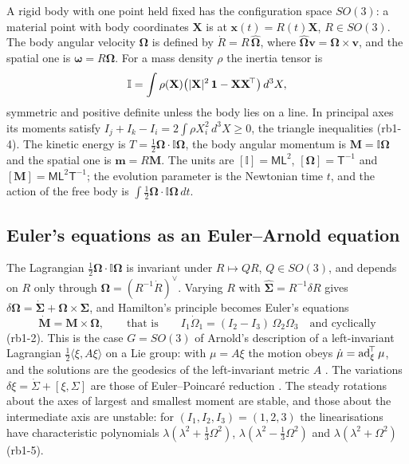 A rigid body with one point held fixed has the configuration space $SO(3)$: a material point with body coordinates $\mathbf X$ is at
$\mathbf x(t)=R(t)\mathbf X$, $R\in SO(3)$. The body angular velocity $\boldsymbol\Omega$ is defined by $\dot R=R\,\widehat{\boldsymbol\Omega}$, where
$\widehat{\boldsymbol\Omega}\mathbf v=\boldsymbol\Omega\times\mathbf v$, and the spatial one is $\boldsymbol\omega=R\boldsymbol\Omega$. For a mass density $\rho$ the
inertia tensor is
\begin{equation}
\label{eq:rb:inertia}
\mathbb I=\int\rho(\mathbf X)\bigl(|\mathbf X|^2\,\mathbf 1-\mathbf X\mathbf X^{\!\top}\bigr)\,d^3X ,
\end{equation}
symmetric and positive definite unless the body lies on a line. In principal axes its moments satisfy $I_j+I_k-I_i=2\int\rho X_i^2\,d^3X\ge0$, the
triangle inequalities (rb1-4). The kinetic energy is $T=\tfrac12\boldsymbol\Omega\cdot\mathbb I\boldsymbol\Omega$, the body angular momentum is
$\mathbf M=\mathbb I\boldsymbol\Omega$ and the spatial one is $\mathbf m=R\mathbf M$. The units are $[\mathbb I]=\mathsf{ML}^2$,
$[\boldsymbol\Omega]=\mathsf T^{-1}$ and $[\mathbf M]=\mathsf{ML}^2\mathsf T^{-1}$; the evolution parameter is the Newtonian time $t$, and the action of the
free body is $\int\tfrac12\boldsymbol\Omega\cdot\mathbb I\boldsymbol\Omega\,dt$.

\subsection{Euler's equations as an Euler--Arnold equation}
\label{sec:rb:euler}

The Lagrangian $\tfrac12\boldsymbol\Omega\cdot\mathbb I\boldsymbol\Omega$ is invariant under $R\mapsto QR$, $Q\in SO(3)$, and depends on $R$ only through
$\boldsymbol\Omega=(R^{-1}\dot R)^\vee$. Varying $R$ with $\widehat{\boldsymbol\Sigma}=R^{-1}\delta R$ gives $\delta\boldsymbol\Omega=\dot{\boldsymbol\Sigma}+\boldsymbol\Omega\times\boldsymbol\Sigma$, and
Hamilton's principle becomes Euler's equations
\begin{equation}
\label{eq:rb:euler}
\dot{\mathbf M}=\mathbf M\times\boldsymbol\Omega,\qquad\text{that is}\qquad I_1\dot\Omega_1=(I_2-I_3)\,\Omega_2\Omega_3\quad\text{and cyclically}
\end{equation}
(rb1-2). This is the case $G=SO(3)$ of Arnold's description of a left-invariant Lagrangian $\tfrac12\langle\xi,A\xi\rangle$ on a Lie group: with
$\mu=A\xi$ the motion obeys $\dot\mu=\operatorname{ad}_\xi^{\!\top}\mu$, and the solutions are the geodesics of the left-invariant metric $A$
\cite{Arnold66,ArnoldKhesin98}. The variations $\delta\xi=\dot\Sigma+[\xi,\Sigma]$ are those of Euler--Poincar\'e reduction \cite{MarsdenRatiu99,HolmMarsdenRatiu98}.
The steady rotations about the axes of largest and smallest moment are stable, and those about the intermediate axis are unstable: for
$(I_1,I_2,I_3)=(1,2,3)$ the linearisations have characteristic polynomials $\lambda(\lambda^2+\tfrac13\Omega^2)$, $\lambda(\lambda^2-\tfrac13\Omega^2)$ and
$\lambda(\lambda^2+\Omega^2)$ (rb1-5).


